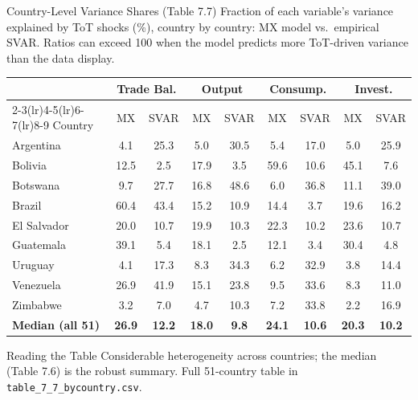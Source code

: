 \documentclass[10pt]{beamer}
\begin{document}
\begin{frame}{Country-Level Variance Shares (Table 7.7)}
\scriptsize
Fraction of each variable's variance explained by ToT shocks (\%), country by
country: MX model vs.\ empirical SVAR. Ratios can exceed 100 when the model
predicts more ToT-driven variance than the data display.
\vspace{0.15cm}
\begin{center}
\begin{tabular}{lcccccccc}
\toprule
& \multicolumn{2}{c}{Trade Bal.} & \multicolumn{2}{c}{Output}
& \multicolumn{2}{c}{Consump.} & \multicolumn{2}{c}{Invest.}\\
\cmidrule(lr){2-3}\cmidrule(lr){4-5}\cmidrule(lr){6-7}\cmidrule(lr){8-9}
Country & MX & SVAR & MX & SVAR & MX & SVAR & MX & SVAR\\
\midrule
Argentina    &   4.1 & 25.3 &  5.0 & 30.5 &  5.4 & 17.0 &  5.0 & 25.9\\
Bolivia      &  12.5 &  2.5 & 17.9 &  3.5 & 59.6 & 10.6 & 45.1 &  7.6\\
Botswana     &   9.7 & 27.7 & 16.8 & 48.6 &  6.0 & 36.8 & 11.1 & 39.0\\
Brazil       &  60.4 & 43.4 & 15.2 & 10.9 & 14.4 &  3.7 & 19.6 & 16.2\\
El Salvador  &  20.0 & 10.7 & 19.9 & 10.3 & 22.3 & 10.2 & 23.6 & 10.7\\
Guatemala    &  39.1 &  5.4 & 18.1 &  2.5 & 12.1 &  3.4 & 30.4 &  4.8\\
Uruguay      &   4.1 & 17.3 &  8.3 & 34.3 &  6.2 & 32.9 &  3.8 & 14.4\\
Venezuela    &  26.9 & 41.9 & 15.1 & 23.8 &  9.5 & 33.6 &  8.3 & 11.0\\
Zimbabwe     &   3.2 &  7.0 &  4.7 & 10.3 &  7.2 & 33.8 &  2.2 & 16.9\\
\midrule
\textbf{Median (all 51)} & \textbf{26.9} & \textbf{12.2} & \textbf{18.0}
& \textbf{9.8} & \textbf{24.1} & \textbf{10.6} & \textbf{20.3} & \textbf{10.2}\\
\bottomrule
\end{tabular}
\end{center}
\vspace{0.1cm}
\begin{block}{Reading the Table}
\centering
Considerable heterogeneity across countries; the median (Table 7.6) is the
robust summary. Full 51-country table in \texttt{table\_7\_7\_bycountry.csv}.
\end{block}
\end{frame}
\end{document}
